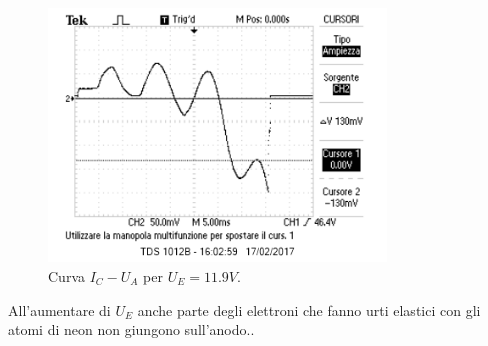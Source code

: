 \documentclass[10pt,a4paper]{article}
\begin{document}
\begin{figure}[h!]
	\centering
		\includegraphics[width=0.80\textwidth]{../oscilloscopio/task5.png}
	\caption{Curva $I_{C} - U_{A}$ per $U_{E}=\unit{11.9}{V}$.}
	\label{task5}
\end{figure}



All'aumentare di $U_{E}$ anche parte degli elettroni che fanno urti elastici con gli atomi di neon non giungono sull'anodo..%
  

 \subsection{}
\end{document}

